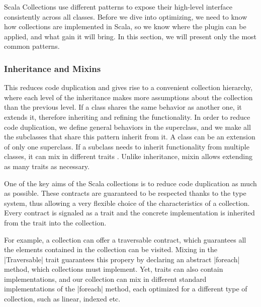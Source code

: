Scala Collections use different patterns to expose their high-level interface consistently across all classes. Before we dive into optimizing, we need to know how collections are implemented in Scala, so we know where the plugin can be applied, and what gain it will bring. In this section, we will present only the most common patterns.


\subsubsection{Inheritance and Mixins}

 This reduces code duplication and gives rise to a convenient collection hierarchy, where each level of the inheritance makes more assumptions about the collection than the previous level. If a class shares the same behavior as another one, it extends it, therefore inheriting and refining the functionality. In order to reduce code duplication, we define general behaviors in the superclass, and we make all the subclasses that share this pattern inherit from it. A class can be an extension of only one superclass. If a subclass needs to inherit functionality from multiple classes, it can mix in different traits \cite{scalable-component-abstractions}. Unlike inheritance, mixin allows extending as many traits as necessary.

One of the key aims of the Scala collections is to reduce code duplication as much as possible.  These contracts are guaranteed to be respected thanks to the type system, thus allowing a very flexible choice of the characteristics of a collection. Every contract is signaled as a trait and the concrete implementation is inherited from the trait into the collection.

For example, a collection can offer a traversable contract, which guarantees all the elements contained in the collection can be visited. Mixing in the |Traversable| trait guarantees this propery by declaring an abstract |foreach| method, which collections must implement. Yet, traits can also contain implementations, and our collection can mix in different standard implementations of the |foreach| method, each optimized for a different type of collection, such as linear, indexed etc.

